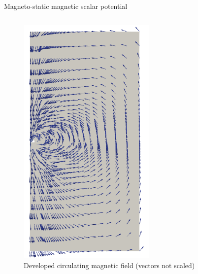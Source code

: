 \documentclass{beamer}
\begin{document}
\begin{frame}{Magneto-static magnetic scalar potential}
{\begin{columns}
\begin{column}{0.49\textwidth}
\begin{figure}[h]
\includegraphics[width=0.6\textwidth]{2d_free_space.png}
\caption{Developed circulating magnetic field (vectors not scaled)}
\end{figure}
\end{column}
\end{columns}
}%
\end{frame}
\end{document}
